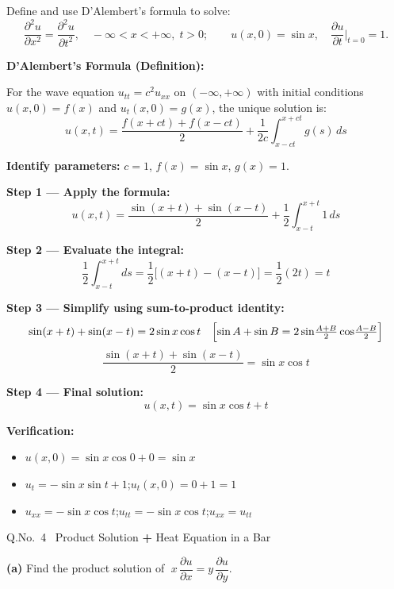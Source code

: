 \documentclass[12pt]{article}
\begin{document}
\medskip
Define and use D'Alembert's formula to solve:
\[
  \frac{\partial^2 u}{\partial x^2}=\frac{\partial^2 u}{\partial t^2},\quad -\infty<x<+\infty,\;t>0;\qquad
  u(x,0)=\sin x,\quad \frac{\partial u}{\partial t}\Big|_{t=0}=1.
\]

\begin{ansbox}
\textbf{D'Alembert's Formula (Definition):}

For the wave equation $u_{tt}=c^2 u_{xx}$ on $(-\infty,+\infty)$ with initial conditions $u(x,0)=f(x)$ and $u_t(x,0)=g(x)$, the unique solution is:
\[
  u(x,t)=\frac{f(x+ct)+f(x-ct)}{2}+\frac{1}{2c}\int_{x-ct}^{x+ct}g(s)\,ds
\]

\medskip
\textbf{Identify parameters:} $c=1$, $f(x)=\sin x$, $g(x)=1$.

\medskip
\textbf{Step 1 — Apply the formula:}
\[
  u(x,t)=\frac{\sin(x+t)+\sin(x-t)}{2}+\frac{1}{2}\int_{x-t}^{x+t}1\,ds
\]

\textbf{Step 2 — Evaluate the integral:}
\[
  \frac{1}{2}\int_{x-t}^{x+t}ds=\frac{1}{2}\bigl[(x+t)-(x-t)\bigr]=\frac{1}{2}(2t)=t
\]

\textbf{Step 3 — Simplify using sum-to-product identity:}
\[
  \sin(x+t)+\sin(x-t)=2\sin x\cos t
  \quad\Bigl[\sin A+\sin B=2\sin\!\tfrac{A+B}{2}\cos\!\tfrac{A-B}{2}\Bigr]
\]
\[
  \frac{\sin(x+t)+\sin(x-t)}{2}=\sin x\cos t
\]

\textbf{Step 4 — Final solution:}
\[
  \boxed{u(x,t)=\sin x\cos t+t}
\]

\textbf{Verification:}
\begin{itemize}[nosep]
  \item $u(x,0)=\sin x\cos 0+0=\sin x$\;\checkmark
  \item $u_t=-\sin x\sin t+1$;\quad $u_t(x,0)=0+1=1$\;\checkmark
  \item $u_{xx}=-\sin x\cos t$;\quad $u_{tt}=-\sin x\cos t$;\quad $u_{xx}=u_{tt}$\;\checkmark
\end{itemize}
\end{ansbox}

\newpage

\begin{qbox}{Q.No.\ 4 \textemdash\ Product Solution \textbf{+} Heat Equation in a Bar}
\end{qbox}

\medskip
\textbf{(a)} Find the product solution of $\;x\,\dfrac{\partial u}{\partial x}=y\,\dfrac{\partial u}{\partial y}$.
\end{document}
